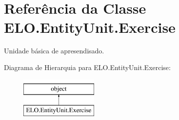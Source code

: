 \hypertarget{classELO_1_1EntityUnit_1_1Exercise}{\section{Referência da Classe E\-L\-O.\-Entity\-Unit.\-Exercise}
\label{d5/d6a/classELO_1_1EntityUnit_1_1Exercise}
}


Unidade básica de apresendisado.  


Diagrama de Hierarquia para E\-L\-O.\-Entity\-Unit.\-Exercise\-:\begin{figure}[H]
\begin{center}
\leavevmode
\includegraphics[height=2.000000cm]{d5/d6a/classELO_1_1EntityUnit_1_1Exercise}
\end{center}
\end{figure}
